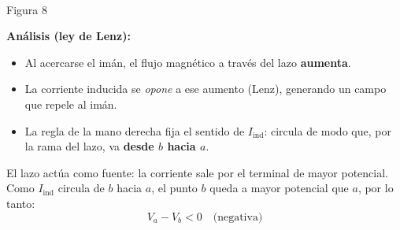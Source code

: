 \documentclass[12pt,letterpaper]{article}
\begin{document}
\noindent
\begin{minipage}[t]{0.44\textwidth}
\centering\vspace{0pt}
\\[2pt]
{\footnotesize Figura 8}
\end{minipage}%
\hfill
\begin{minipage}[t]{0.53\textwidth}
\vspace{0pt}
\textbf{An\'alisis (ley de Lenz):}
\begin{itemize}\setlength\itemsep{2pt}
    \item Al acercarse el im\'an, el flujo magn\'etico a trav\'es del lazo \textbf{aumenta}.
    \item La corriente inducida se \emph{opone} a ese aumento (Lenz), generando un campo que
          repele al im\'an.
    \item La regla de la mano derecha fija el sentido de $I_{\text{ind}}$: circula de modo que,
          por la rama del lazo, va \textbf{desde $b$ hacia $a$}.
\end{itemize}
\end{minipage}

\medskip

\noindent El lazo act\'ua como fuente: la corriente sale por el terminal de mayor potencial. Como
$I_{\text{ind}}$ circula de $b$ hacia $a$, el punto $b$ queda a mayor potencial que $a$, por lo
tanto:
\[
    \boxed{V_a - V_b < 0 \quad\text{(negativa)}}
\]
\end{document}
